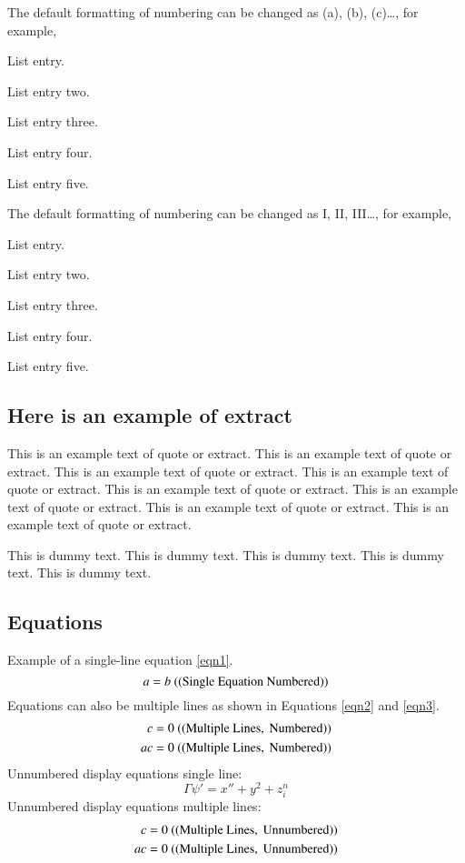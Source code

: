 \documentclass{aer}      %
\begin{document}
The default formatting of numbering can be changed as (a), (b), (c)\ldots, for example, 
\begin{alphalist}
\item List entry.
\item List entry two.
\item List entry three.
\item List entry four.
\item List entry five.
\end{alphalist}


The default formatting of numbering can be changed as I, II, III\ldots, for example, 
\begin{Romanlist}
\item List entry.
\item List entry two.
\item List entry three.
\item List entry four.
\item List entry five.
\end{Romanlist}


\subsection{Here is an example of extract}

\begin{extract}
This is an example text of quote or extract. This is an example text of quote or extract. This is an example text of quote or extract. This is an example text of quote or extract. This is an example text of quote or extract. This is an example text of quote or extract. This is an example text of quote or extract. This is an example text of quote or extract.
\end{extract}


This is dummy text. This is dummy text. This is dummy text. This is dummy text. This is dummy text. 

\subsection{Equations}
Example of a single-line equation \ref{eqn1}.
\begin{equation}
a = b \ {\rm ((Single\ Equation\ Numbered))}\label{eqn1}
\end{equation}
Equations can also be multiple lines as shown in Equations \ref{eqn2} and \ref{eqn3}.
\begin{eqnarray}
c = 0 \ {\rm ((Multiple\  Lines, \ Numbered))}\label{eqn2}\\
ac = 0 \ {\rm ((Multiple \ Lines, \ Numbered))}\label{eqn3}
\end{eqnarray}
Unnumbered display equations single line:
   \[  {\Gamma}{\psi'} = x'' + y^{2} + z_{i}^{n}\]
Unnumbered display equations multiple lines:
\begin{eqnarray*}
c = 0 \ {\rm ((Multiple\  Lines, \ Unnumbered))}\nonumber\\
ac = 0 \ {\rm ((Multiple \ Lines, \ Unnumbered))}\nonumber
\end{eqnarray*}
\end{document}
